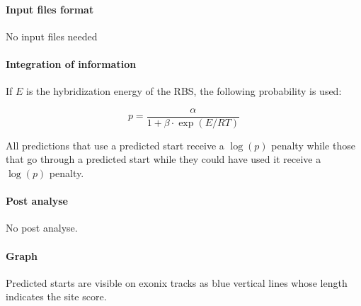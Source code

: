 \paragraph{Input files format} No input files needed

\paragraph{Integration of information}

If $E$ is the hybridization energy of the RBS, the following probability is used:

  \[p=\frac{\alpha}{1+\beta\cdot\exp(E/RT)}\]

All predictions that use a predicted start receive a $\log(p)$
penalty while those that go through a predicted start while they
could have used it receive a $\log(p)$ penalty.

\paragraph{Post analyse}

No post analyse.

\paragraph{Graph}

Predicted starts are visible on exonix tracks as blue vertical lines
whose length indicates the site score.
